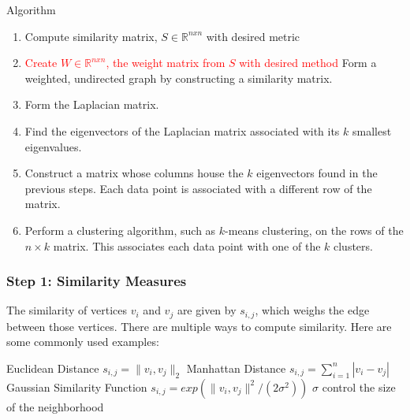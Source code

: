 \documentclass{beamer}
\begin{document}
\begin{frame}{Algorithm}
    \begin{enumerate}
        \item Compute similarity matrix, $S \in \mathbb{R}^{nxn}$ with desired metric 
        \item \textcolor{red}{Create $W \in \mathbb{R}^{nxn}$, the weight matrix from $S$ with desired method }Form a weighted, undirected graph by constructing a similarity matrix. 
        \item Form the Laplacian matrix. 
        \item Find the eigenvectors of the Laplacian matrix associated with its $k$ smallest eigenvalues.
        \item Construct a matrix whose columns house the $k$ eigenvectors found in the previous steps. Each data point is associated with a different row of the matrix. 
        \item Perform a clustering algorithm, such as $k$-means clustering, on the rows of the $n \times k$ matrix. This associates each data point with one of the $k$ clusters.
    \end{enumerate}
\end{frame}

\begin{frame}
\frametitle{Step 1: Similarity Measures}
The similarity of vertices $v_i$ and $v_j$ are given by $s_{i,j}$, which weighs the edge between those vertices. There are multiple ways to compute similarity. Here are some commonly used examples:
\vspace{0.25 cm}
\begin{outline}
    \1 Euclidean Distance
        \2 $s_{i,j} = \| v_i, v_j\|_2$
    \1 Manhattan Distance
        \2 $s_{i,j} = \sum_{i=1}^{n} | v_i - v_j|$
    \1 Gaussian Similarity Function
        \2 $s_{i,j} = exp(\| v_i, v_j\|^2 / (2\sigma^2))$
            \3 $\sigma$ control the size of the neighborhood 
\end{outline}

\end{frame}
\end{document}
